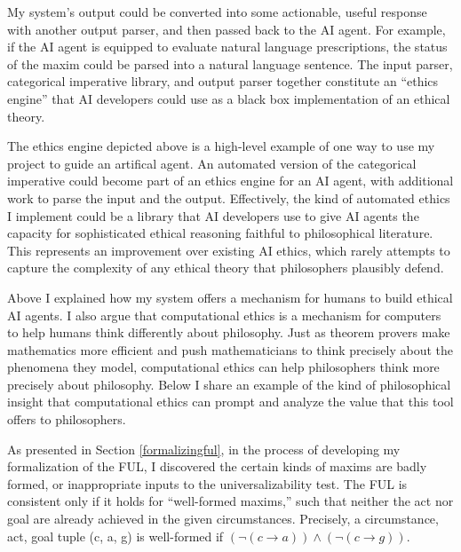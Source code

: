 \begin{isabellebody}
\begin{isamarkuptext}
My system's output could be converted into some actionable, useful response with another output parser, 
and then passed back to the AI agent. For example, if the AI agent is equipped to evaluate natural 
language prescriptions, the status of the maxim could be parsed into a natural language sentence. The 
input parser, categorical imperative library, and output parser together constitute an ``ethics engine'' 
that AI developers could use as a black box implementation of an ethical theory. 

The ethics engine depicted above is a high-level example of one way to use my project to guide an artifical agent.
An automated version of the categorical imperative could become part of an ethics engine 
for an AI agent, with additional work to parse the input and the output. Effectively, the kind 
of automated ethics I implement could be a library that AI developers use to give AI agents the capacity for 
sophisticated ethical reasoning faithful to philosophical literature. This represents an improvement 
over existing AI ethics, which rarely attempts to capture the complexity 
of any ethical theory that philosophers plausibly defend.%
\end{isamarkuptext}\isamarkuptrue%
%
\isadelimdocument
%
\endisadelimdocument
%
\isatagdocument
%
\isamarkuptrue%
%
\endisatagdocument
{\isafolddocument}%
%
\isadelimdocument
%
\endisadelimdocument
%
\begin{isamarkuptext}%
Above I explained how my system offers a mechanism for humans to build ethical AI agents. I also 
argue that computational ethics is a mechanism for computers to help humans think differently about 
philosophy. Just as theorem provers make mathematics more efficient and push mathematicians to think 
precisely about the phenomena they model, computational ethics can help philosophers think more precisely about 
philosophy. Below I share an example of the kind of philosophical insight that computational ethics 
can prompt and analyze the value that this tool offers to philosophers.%
\end{isamarkuptext}\isamarkuptrue%
%
\isadelimdocument
%
\endisadelimdocument
%
\isatagdocument
%
\isamarkuptrue%
%
\endisatagdocument
{\isafolddocument}%
%
\isadelimdocument
%
\endisadelimdocument
%
\begin{isamarkuptext}%
As presented in Section \ref{formalizingful}, in the process of developing my formalization of
the FUL, I discovered the certain kinds of maxims are badly formed, or inappropriate inputs to the 
universalizability test. The FUL is consistent only if it holds for ``well-formed maxims,''
such that neither the act nor goal are already achieved in the given circumstances. Precisely, 
a circumstance, act, goal tuple (c, a, g) is well-formed if $(\neg (c \longrightarrow a) ) \wedge 
(\neg(c \longrightarrow g))$. 


\end{isamarkuptext}
\end{isabellebody}
